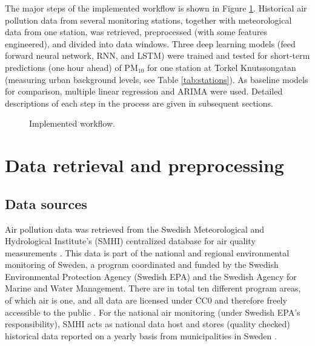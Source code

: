 The major steps of the implemented workflow is shown in Figure \ref{fig:dataflow}. Historical air pollution data from several monitoring stations, together with meteorological data from one station, was retrieved, preprocessed (with some features engineered), and divided into data windows. Three deep learning models (feed forward neural network, RNN, and LSTM) were trained and tested for short-term predictions (one hour ahead) of PM$_{10}$ for one station at Torkel Knutssongatan (measuring urban background levels, see Table \ref{tab:stations}). As baseline models for comparison, multiple linear regression and ARIMA were used. Detailed descriptions of each step in the process are given in subsequent sections. 

\begin{figure}[htbp]
\begin{center}
\caption{Implemented workflow.}
\label{fig:dataflow}
\end{center}
\end{figure}

\section{Data retrieval and preprocessing}
\label{chap:dataprocesschap}

\subsection{Data sources}
\label{sec:data-sources}

Air pollution data was retrieved from the Swedish Meteorological and Hydrological Institute's (SMHI) centralized database for air quality measurements \cite{smhi-luftmatningar}. This data is part of the national and regional environmental monitoring of Sweden, a program coordinated and funded by the Swedish Environmental Protection Agency (Swedish EPA) and the Swedish Agency for Marine and Water Management. There are in total ten different program areas, of which air is one, and all data are licensed under CC0 and therefore freely accessible to the public \cite{naturvardsverket-miljodata}. For the national air monitoring (under Swedish EPA's responsibility), SMHI acts as national data host and stores (quality checked) historical data reported on a yearly basis from municipalities in Sweden \cite{smhi-luftmatningar}.

